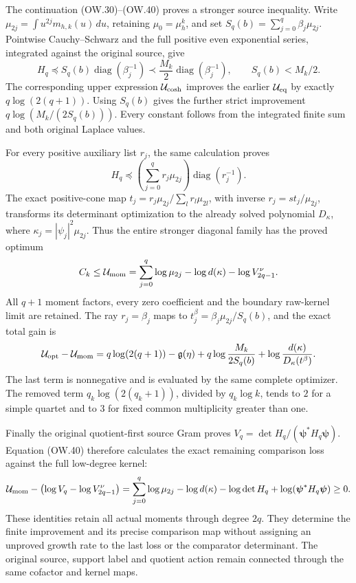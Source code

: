 The continuation (OW.30)--(OW.40) proves a stronger source inequality.
Write $\mu_{2j}=\int u^{2j}m_{h,k}(u)\,du$, retaining
$\mu_0=\mu_h^k$, and set $S_q(b)=\sum_{j=0}^q\beta_j\mu_{2j}$.
Pointwise Cauchy--Schwarz and the full positive even exponential
series, integrated against the original source, give
\[
 H_q\preceq S_q(b)\operatorname{diag}(\beta_j^{-1})
   \prec\frac{M_k}{2}\operatorname{diag}(\beta_j^{-1}),
 \qquad S_q(b)<M_k/2.
\]
The corresponding upper expression $\mathcal U_{\rm cosh}$ improves
the earlier $\mathcal U_{\rm eq}$ by exactly
$q\log(2(q+1))$. Using $S_q(b)$ gives the further strict
improvement $q\log(M_k/(2S_q(b)))$. Every constant follows from
the integrated finite sum and both original Laplace values.

For every positive auxiliary list $r_j$, the same calculation proves
\[
 H_q\preceq\left(\sum_{j=0}^q r_j\mu_{2j}\right)
                \operatorname{diag}(r_j^{-1}).
\]
The exact positive-cone map
$t_j=r_j\mu_{2j}/\sum_l r_l\mu_{2l}$, with inverse
$r_j=s t_j/\mu_{2j}$, transforms its determinant optimization
to the already solved polynomial $D_\kappa$, where
$\kappa_j=|\psi_j|^2\mu_{2j}$. Thus the entire stronger
diagonal family has the proved optimum
\[
 C_k\le\mathcal U_{\rm mom}
   =\sum_{j=0}^q\log\mu_{2j}-\log d(\kappa)
                   -\log V_{2q-1}^{\nu}.
\]
All $q+1$ moment factors, every zero coefficient and the boundary
raw-kernel limit are retained. The ray $r_j=\beta_j$ maps to
$t_j^{\beta}=\beta_j\mu_{2j}/S_q(b)$, and the exact total gain is
\[
 \mathcal U_{\rm opt}-\mathcal U_{\rm mom}
 =q\log(2(q+1))-\mathfrak g(\eta)
   +q\log\frac{M_k}{2S_q(b)}
   +\log\frac{d(\kappa)}{D_\kappa(t^{\beta})}.
\]
The last term is nonnegative and is evaluated by the same complete
optimizer. The removed term $q_k\log(2(q_k+1))$, divided by
$q_k\log k$, tends to $2$ for a simple quartet and to $3$ for
fixed common multiplicity greater than one.

Finally the original quotient-first source Gram proves
$V_q=\det H_q/(\boldsymbol\psi^*H_q\boldsymbol\psi)$.
Equation (OW.40) therefore calculates the exact remaining comparison
loss against the full low-degree kernel:
\[
 \mathcal U_{\rm mom}
       -\bigl(\log V_q-\log V_{2q-1}^{\nu}\bigr)
 =\sum_{j=0}^q\log\mu_{2j}-\log d(\kappa)-\log\det H_q
      +\log(\boldsymbol\psi^*H_q\boldsymbol\psi)\ge0.
\]
These identities retain all actual moments through degree $2q$.
They determine the finite improvement and its precise comparison
map without assigning an unproved growth rate to the last loss or
the comparator determinant. The original source, support label and
quotient action remain connected through the same cofactor and
kernel maps.
